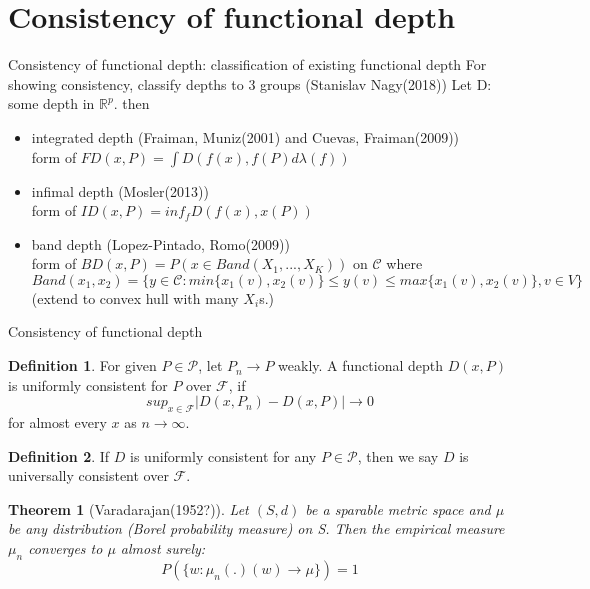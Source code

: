 \documentclass[aspectratio=169,ignorenonframetext,9pt]{beamer}
\theoremstyle{plain}
\newtheorem{thm}{Theorem}[section]
\theoremstyle{definition}
\newtheorem{defn}{Definition}[section]
\begin{document}
\section{Consistency of functional depth}
\begin{frame}{Consistency of functional depth: classification of existing functional depth}
    For showing consistency, classify depths to 3 groups (Stanislav Nagy(2018))
    Let D: some depth in $\mathbb{R}^p$. then
    \begin{itemize}
        \item integrated depth (Fraiman, Muniz(2001) and  Cuevas, Fraiman(2009)) \\
        form of \(FD(x,P)=\int D(f(x),f(P)d\lambda(f))\)
        \item infimal depth (Mosler(2013))\\
        form of \(ID(x,P)=inf_f D(f(x),x(P))\)
        \item band depth (Lopez-Pintado, Romo(2009))\\
        form of \(BD(x,P)=P(x\in Band(X_1,...,X_K))\) on $\mathcal{C}$
        where $Band(x_1,x_2)=\{y\in\mathcal{C}: min\{x_1(v),x_2(v)\} \leq y(v) \leq max\{x_1(v),x_2(v)\}, v\in V\}$ \\
        (extend to convex hull with many $X_i$s.)
    \end{itemize}
\end{frame}

\begin{frame}{Consistency of functional depth}
    \begin{defn}
        For given $P\in\mathcal{P}$, let $P_n\rightarrow P$ weakly.
        A functional depth $D(x,P)$ is uniformly consistent for $P$ over $\mathcal{F}$,
        if
        \[sup_{x\in\mathcal{F}}|D(x,P_n)-D(x,P)|\rightarrow 0\]
        for almost every $x$ as $n\rightarrow\infty$.
    \end{defn}
    \begin{defn}
        If $D$ is uniformly consistent for any $P\in\mathcal{P}$,
        then we say $D$ is universally consistent over $\mathcal{F}$.
    \end{defn}
    \begin{thm}[Varadarajan(1952?)]
        Let $(S,d)$ be a sparable metric space and $\mu$ be any distribution (Borel probability measure) on S.
        Then the empirical measure $\mu_n$ converges to $\mu$ almost surely:
        \[P(\{w:\mu_n(.)(w)\rightarrow\mu\})=1\]
    \end{thm}
\end{frame}
\end{document}
